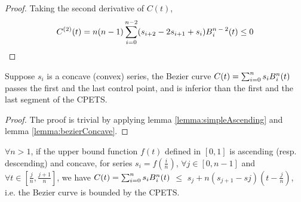 \begin{proof}
Taking the second derivative of $C(t)$,
\begin{equation}\begin{split}
C^{(2)}(t)=n(n-1)\sum_{i=0}^{n-2}(s_{i+2}-2s_{i+1}+s_{i})B\textsupsub{$n-2$}{$i$}(t) \le 0
\end{split}\end{equation}
\end{proof}

\begin{corollary}
Suppose $s_{i}$ is a concave (convex) series, the Bezier curve $C(t)=\sum_{i=0}^{n}s_{i}B\textsupsub{$n$}{$i$}(t)$ passes the first and the last control point, and is inferior than the first and the last segment of the CPETS.
\label{corollary:tangentFistLastPoint}
\end{corollary}

\begin{proof}
The proof is trivial by applying lemma \ref{lemma:simpleAscending} and lemma \ref{lemma:bezierConcave}.
\end{proof}

\begin{lemma}
$\forall n > 1$, if the upper bound function $f(t)$ defined in $\left[0,1\right]$ is ascending (resp. descending) and concave, for series $s_{i}=f(\frac{i}{n})$, $\forall j \in \left[0, n-1\right]$ and 
$\forall t \in \left[\frac{j}{n}, \frac{j+1}{n}\right]$, we have $C(t)=\sum_{i=0}^{n}s_{i}B\textsupsub{$n$}{$i$}(t)$ $\le$ $s_{j}+n(s_{j+1}-s{j})(t-\frac{j}{n})$, i.e. the Bezier curve is bounded by the CPETS.
\label{lemma:mainLemma}
\end{lemma}

